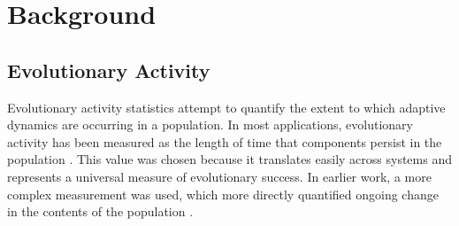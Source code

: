 \documentclass[letterpaper]{article}
\begin{document}


\section{Background}


\subsection{Evolutionary Activity}

Evolutionary activity statistics attempt
to quantify the extent to which adaptive dynamics are occurring in a population. In most applications, evolutionary activity has been measured as the length of time that components persist in the population \citep{bedau_comparison_1997, bedau_classification_1998, channon_improving_2003}. This value was chosen because it translates easily across systems and %
represents a universal measure of evolutionary success.
In earlier work, a more complex measurement was used, which more directly quantified ongoing change in the contents of the population \citep{langton_measurement_1992}. 
\end{document}
